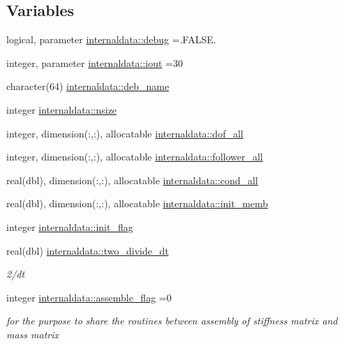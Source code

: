\subsection*{Variables}
\begin{DoxyCompactItemize}
\item 
logical, parameter \hyperlink{namespaceinternaldata_a0c3051eb2c273aad5bebc55fd79236ea}{internaldata\+::debug} =.F\+A\+L\+S\+E.
\item 
integer, parameter \hyperlink{namespaceinternaldata_a82858bed9f1804b4d9d545add41703b8}{internaldata\+::iout} =30
\item 
character(64) \hyperlink{namespaceinternaldata_abe3cfd1606a2a73e5e71421a1abc89dd}{internaldata\+::deb\+\_\+name}
\item 
integer \hyperlink{namespaceinternaldata_a870ff06e13dc622293c20b2cc20641b9}{internaldata\+::nsize}
\item 
integer, dimension(\+:,\+:), allocatable \hyperlink{namespaceinternaldata_a64b1e517fcf8a25bce3446ec324a4698}{internaldata\+::dof\+\_\+all}
\item 
integer, dimension(\+:,\+:), allocatable \hyperlink{namespaceinternaldata_a2037100926e06d16be5b80c12d0c36e9}{internaldata\+::follower\+\_\+all}
\item 
real(dbl), dimension(\+:,\+:), allocatable \hyperlink{namespaceinternaldata_aeb804e680e34df79573f79272474bd2c}{internaldata\+::cond\+\_\+all}
\item 
real(dbl), dimension(\+:,\+:), allocatable \hyperlink{namespaceinternaldata_a187a3d4ecc99e732bd15234944dae732}{internaldata\+::init\+\_\+memb}
\item 
integer \hyperlink{namespaceinternaldata_accc2e120df220e17a9e2b6cc72e42793}{internaldata\+::init\+\_\+flag}
\item 
real(dbl) \hyperlink{namespaceinternaldata_a6c7ccd03dc69209443b0d6756c26f43a}{internaldata\+::two\+\_\+divide\+\_\+dt}
\begin{DoxyCompactList}\small\item\em 2/dt \end{DoxyCompactList}\item 
integer \hyperlink{namespaceinternaldata_ae1ae8091a874c45a6efe110578e140bc}{internaldata\+::assemble\+\_\+flag} =0
\begin{DoxyCompactList}\small\item\em for the purpose to share the routines between assembly of stiffness matrix and mass matrix \end{DoxyCompactList}\item 

\end{DoxyCompactItemize}
